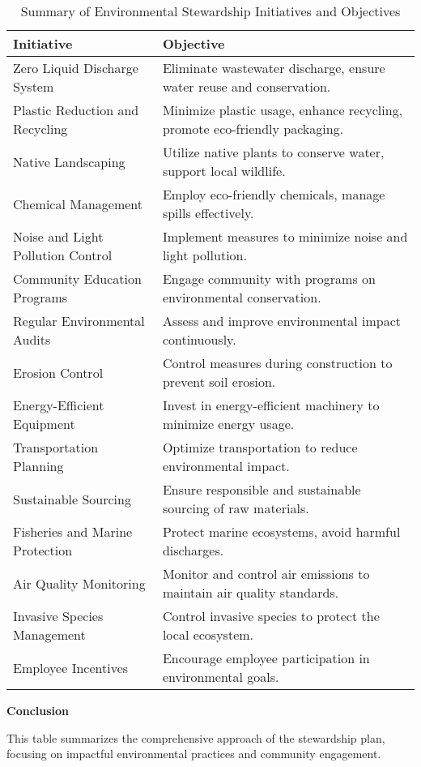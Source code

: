 \documentclass{article}
\begin{document}
\begin{itemize}
\begin{table}[ht]
\centering
\caption{Summary of Environmental Stewardship Initiatives and Objectives}
\begin{tabular}{@{}ll@{}}
\toprule
\textbf{Initiative} & \textbf{Objective} \\ 
\midrule
Zero Liquid Discharge System & Eliminate wastewater discharge, ensure water reuse and conservation. \\
Plastic Reduction and Recycling & Minimize plastic usage, enhance recycling, promote eco-friendly packaging. \\
Native Landscaping & Utilize native plants to conserve water, support local wildlife. \\
Chemical Management & Employ eco-friendly chemicals, manage spills effectively. \\
Noise and Light Pollution Control & Implement measures to minimize noise and light pollution. \\
Community Education Programs & Engage community with programs on environmental conservation. \\
Regular Environmental Audits & Assess and improve environmental impact continuously. \\
Erosion Control & Control measures during construction to prevent soil erosion. \\
Energy-Efficient Equipment & Invest in energy-efficient machinery to minimize energy usage. \\
Transportation Planning & Optimize transportation to reduce environmental impact. \\
Sustainable Sourcing & Ensure responsible and sustainable sourcing of raw materials. \\
Fisheries and Marine Protection & Protect marine ecosystems, avoid harmful discharges. \\
Air Quality Monitoring & Monitor and control air emissions to maintain air quality standards. \\
Invasive Species Management & Control invasive species to protect the local ecosystem. \\
Employee Incentives & Encourage employee participation in environmental goals. \\
\bottomrule
\end{tabular}
\label{tab:stewardship_plan}
\end{table}

\textbf{Conclusion}\par
This table summarizes the comprehensive approach of the stewardship plan, focusing on impactful environmental practices and community engagement.


\end{itemize}
\end{document}
